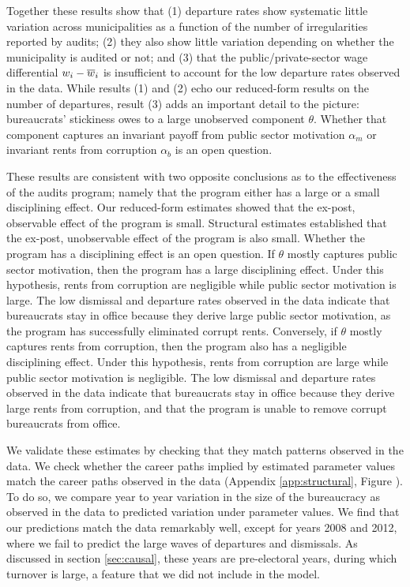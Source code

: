 {Together these results show that (1) departure rates show systematic little variation across municipalities as a function of the number of irregularities reported by audits; (2) they also show little variation depending on whether the municipality is audited or not; and (3) that the public/private-sector wage differential $w_i - \overline{w}_i$ is insufficient to account for the low departure rates observed in the data. While results (1) and (2) echo our reduced-form results on the number of departures, result (3) adds an important detail to the picture: bureaucrats' stickiness owes to a large unobserved component $\theta$. Whether that component captures an invariant payoff from public sector motivation $\alpha_m$ or invariant rents from corruption $\alpha_b$ is an open question. 

These results are consistent with two opposite conclusions as to the effectiveness of the audits program; namely that the program either has a large or a small disciplining effect. Our reduced-form estimates showed that the ex-post, observable effect of the program is small. Structural estimates established that the ex-post, unobservable effect of the program is also small. Whether the program has a disciplining effect is an open question. If $\theta$ mostly captures public sector motivation, then the program has a large disciplining effect. Under this hypothesis, rents from corruption are negligible while public sector motivation is large. The low dismissal and departure rates observed in the data indicate that bureaucrats stay in office because they derive large public sector motivation, as the program has successfully eliminated corrupt rents. Conversely, if $\theta$ mostly captures rents from corruption, then the program also has a negligible disciplining effect. Under this hypothesis, rents from corruption are large while public sector motivation is negligible. The low dismissal and departure rates observed in the data indicate that bureaucrats stay in office because they derive large rents from corruption, and that the program is unable to remove corrupt bureaucrats from office.

We validate these estimates by checking that they match patterns observed in the data. We check whether the career paths implied by estimated parameter values match the career paths observed in the data (Appendix \ref{app:structural}, Figure \label{fig:validationStructuralSize}). To do so, we compare year to year variation in the size of the bureaucracy as observed in the data to predicted variation under parameter values. We find that our predictions match the data remarkably well, except for years 2008 and 2012, where we fail to predict the large waves of departures and dismissals. As discussed in section \ref{sec:causal}, these years are pre-electoral years, during which turnover is large, a feature that we did not include in the model.  

}
